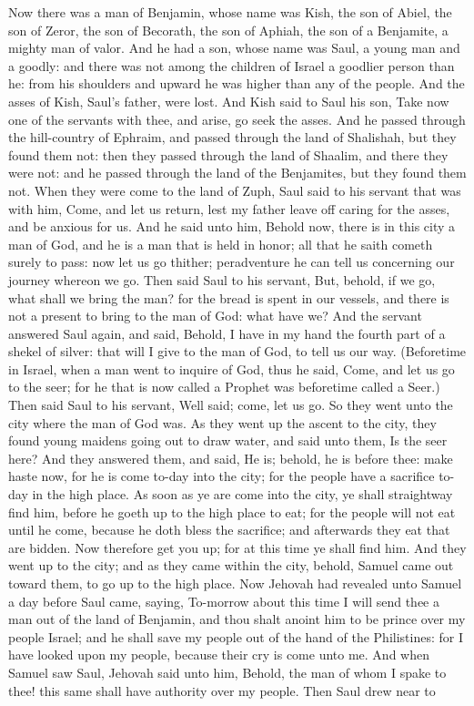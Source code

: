 Now there was a man of Benjamin, whose name was Kish, the son of Abiel, the son of Zeror, the son of Becorath, the son of Aphiah, the son of a Benjamite, a mighty man of valor. And he had a son, whose name was Saul, a young man and a goodly: and there was not among the children of Israel a goodlier person than he: from his shoulders and upward he was higher than any of the people. And the asses of Kish, Saul’s father, were lost. And Kish said to Saul his son, Take now one of the servants with thee, and arise, go seek the asses. And he passed through the hill-country of Ephraim, and passed through the land of Shalishah, but they found them not: then they passed through the land of Shaalim, and there they were not: and he passed through the land of the Benjamites, but they found them not.  When they were come to the land of Zuph, Saul said to his servant that was with him, Come, and let us return, lest my father leave off caring for the asses, and be anxious for us. And he said unto him, Behold now, there is in this city a man of God, and he is a man that is held in honor; all that he saith cometh surely to pass: now let us go thither; peradventure he can tell us concerning our journey whereon we go. Then said Saul to his servant, But, behold, if we go, what shall we bring the man? for the bread is spent in our vessels, and there is not a present to bring to the man of God: what have we? And the servant answered Saul again, and said, Behold, I have in my hand the fourth part of a shekel of silver: that will I give to the man of God, to tell us our way. (Beforetime in Israel, when a man went to inquire of God, thus he said, Come, and let us go to the seer; for he that is now called a Prophet was beforetime called a Seer.) Then said Saul to his servant, Well said; come, let us go. So they went unto the city where the man of God was.  As they went up the ascent to the city, they found young maidens going out to draw water, and said unto them, Is the seer here? And they answered them, and said, He is; behold, he is before thee: make haste now, for he is come to-day into the city; for the people have a sacrifice to-day in the high place. As soon as ye are come into the city, ye shall straightway find him, before he goeth up to the high place to eat; for the people will not eat until he come, because he doth bless the sacrifice; and afterwards they eat that are bidden. Now therefore get you up; for at this time ye shall find him. And they went up to the city; and as they came within the city, behold, Samuel came out toward them, to go up to the high place.  Now Jehovah had revealed unto Samuel a day before Saul came, saying, To-morrow about this time I will send thee a man out of the land of Benjamin, and thou shalt anoint him to be prince over my people Israel; and he shall save my people out of the hand of the Philistines: for I have looked upon my people, because their cry is come unto me. And when Samuel saw Saul, Jehovah said unto him, Behold, the man of whom I spake to thee! this same shall have authority over my people. Then Saul drew near to 